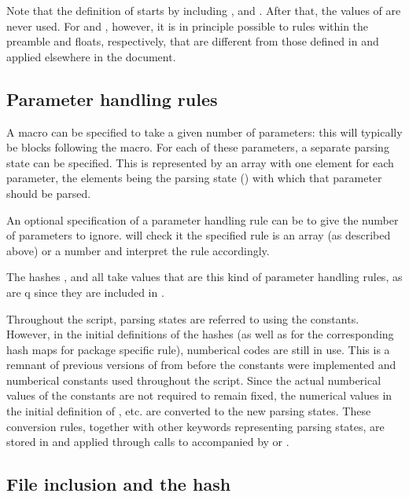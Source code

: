 \documentclass{article}
\newcommand\wild{\ldots}
\begin{document}
Note that the definition of  starts by including ,  and . After that, the values of  are never used. For  and , however, it is in principle possible to rules within the preamble and floats, respectively, that are different from those defined in  and applied elsewhere in the document.


\subsection{Parameter handling rules}

A macro can be specified to take a given number of parameters: this will typically be \code{\{\ldots\}} blocks following the macro. For each of these parameters, a separate parsing state can be specified. This is represented by an array with one element for each parameter, the elements being the parsing state (\code{\$STATE_\wild}) with which that parameter should be parsed.

An optional specification of a parameter handling rule can be to give the number of parameters to ignore. \TeXcount{} will check it the specified rule is an array (as described above) or a number and interpret the rule accordingly.

The hashes ,  and  all take values that are this kind of parameter handling rules, as are q since they are included in .

Throughout the script, parsing states are referred to using the \code{\$STATE_\wild} constants. However, in the initial definitions of the hashes (as well as for the corresponding hash maps for package specific rule), numberical codes are still in use. This is a remnant of previous versions of \TeXcount{} from before the \code{\$STATE_\wild} constants were implemented and numberical constants used throughout the script. Since the actual numberical values of the \code{\$STATE_\wild} constants are not required to remain fixed, the numerical values in the initial definition of , etc. are converted to the new parsing states. These conversion rules, together with other keywords representing parsing states, are stored in  and applied through calls to  accompanied by  or .


\subsection{File inclusion and the  hash}
\end{document}
